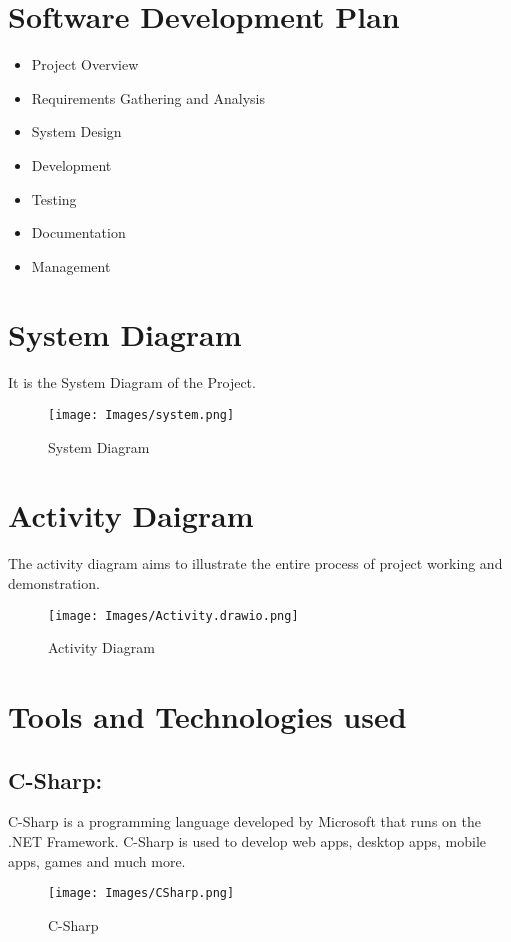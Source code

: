 \section{Software Development Plan}
\begin{itemize}
    \item Project Overview 
    \item Requirements Gathering and Analysis
    \item System Design
    \item Development
    \item Testing
    \item Documentation
    \item Management
\end{itemize}

\section{System Diagram}
It is the System Diagram of the Project.
\begin{figure}[h]
    \centering
    \texttt{[image: Images/system.png]}
    \caption{System Diagram}
\end{figure}
\newpage
\section{Activity Daigram}
The activity diagram aims to illustrate the entire process of project working and demonstration.
\begin{figure}[h]
    \centering
    \texttt{[image: Images/Activity.drawio.png]}
    \caption{Activity Diagram}
\end{figure}
\newpage
\section{Tools and Technologies used}
\subsection{C-Sharp:}
C-Sharp is a programming language developed by Microsoft that runs on the .NET Framework. C-Sharp is used to develop web apps, desktop apps, mobile apps, games and much more.
\begin{figure}[h]
	\centering
	\texttt{[image: Images/CSharp.png]}
	\caption{C-Sharp\cite{csharp}}
\end{figure}
